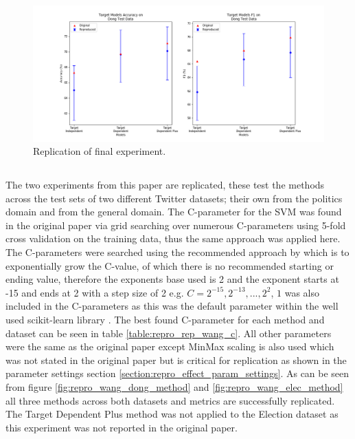 \begin{figure}
    \centering
    \includegraphics[scale=0.55]{images/reproducibility/Replication_Cases/Target_Replication_Dong.png}
    \caption{Replication of \citet{vo2015target} final experiment.}
    \label{fig:repro_vo_method}
\end{figure}

\subsection{\cite{wang-etal-2017-tdparse}}
The two experiments from this paper are replicated, these test the methods across the test sets of two different Twitter datasets; their own from the politics domain and \citet{dong-etal-2014-adaptive} from the general domain. The C-parameter for the SVM was found in the original paper via grid searching over numerous C-parameters using 5-fold cross validation on the training data, thus the same approach was applied here. The C-parameters were searched using the recommended approach by \citet{hsu2003practical} which is to exponentially grow the C-value, of which there is no recommended starting or ending value, therefore the exponents base used is 2 and the exponent starts at -15 and ends at 2 with a step size of 2 e.g. $C = 2^{-15}, 2^{-13},..., 2^2$, $1$ was also included in the C-parameters as this was the default parameter within the well used scikit-learn library \citep{pedregosa2011scikit}. The best found C-parameter for each method and dataset can be seen in table \ref{table:repro_rep_wang_c}. All other parameters were the same as the original paper except MinMax scaling is also used which was not stated in the original paper but is critical for replication as shown in the parameter settings section \ref{section:repro_effect_param_settings}. As can be seen from figure \ref{fig:repro_wang_dong_method} and \ref{fig:repro_wang_elec_method} all three methods across both datasets and metrics are successfully replicated. The Target Dependent Plus method was not applied to the Election dataset as this experiment was not reported in the original paper.

